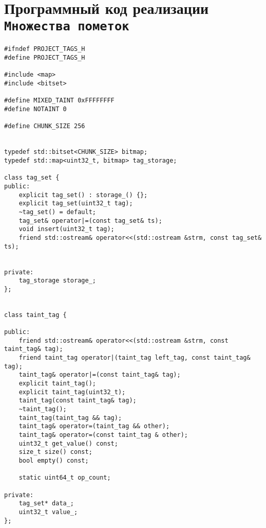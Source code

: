 \chapter{Программный код реализации \texttt{Множества пометок}}
\label{tagsetimpl}

\begin{lstlisting}[environoment=сpp_code, caption=tags.h]
#ifndef PROJECT_TAGS_H
#define PROJECT_TAGS_H

#include <map>
#include <bitset>

#define MIXED_TAINT 0xFFFFFFFF
#define NOTAINT 0

#define CHUNK_SIZE 256


typedef std::bitset<CHUNK_SIZE> bitmap;
typedef std::map<uint32_t, bitmap> tag_storage;

class tag_set {
public:
    explicit tag_set() : storage_() {};
    explicit tag_set(uint32_t tag);
    ~tag_set() = default;
    tag_set& operator|=(const tag_set& ts);
    void insert(uint32_t tag);
    friend std::ostream& operator<<(std::ostream &strm, const tag_set& ts);

    
private:
    tag_storage storage_;
};


class taint_tag {

public:
    friend std::ostream& operator<<(std::ostream &strm, const taint_tag& tag);
    friend taint_tag operator|(taint_tag left_tag, const taint_tag& tag);
    taint_tag& operator|=(const taint_tag& tag);
    explicit taint_tag();
    explicit taint_tag(uint32_t);
    taint_tag(const taint_tag& tag);
    ~taint_tag();
    taint_tag(taint_tag && tag);
    taint_tag& operator=(taint_tag && other);
    taint_tag& operator=(const taint_tag & other);
    uint32_t get_value() const;
    size_t size() const;
    bool empty() const;

    static uint64_t op_count;

private:
    tag_set* data_;
    uint32_t value_;
};
\end{lstlisting}

